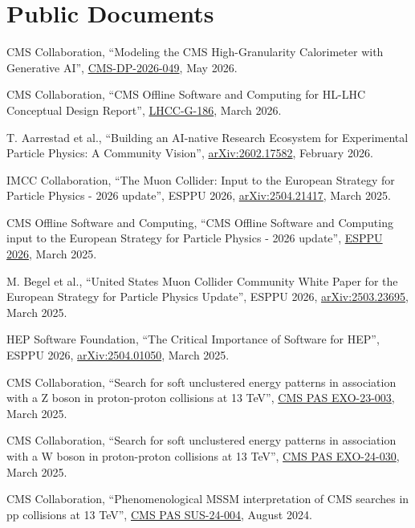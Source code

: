 \section{Public Documents}
\begin{nbdescription}[leftmargin=12pt,font=\normalfont,labelsep=0em]
\item CMS Collaboration, ``Modeling the CMS High-Granularity Calorimeter with Generative AI'', \href{https://cds.cern.ch/record/2962239}{CMS-DP-2026-049}, May 2026.
\item CMS Collaboration, ``CMS Offline Software and Computing for HL-LHC Conceptual Design Report'', \href{https://cds.cern.ch/record/2957472}{LHCC-G-186}, March 2026.
\item T. Aarrestad et al., ``Building an AI-native Research Ecosystem for Experimental Particle Physics: A Community Vision'', \href{https://arxiv.org/abs/2602.17582}{arXiv:2602.17582}, February 2026. %
\item IMCC Collaboration, ``The Muon Collider: Input to the European Strategy for Particle Physics - 2026 update'', ESPPU 2026, \href{https://arxiv.org/abs/2504.21417}{arXiv:2504.21417}, March 2025. %
\item CMS Offline Software and Computing, ``CMS Offline Software and Computing input to the European Strategy for Particle Physics - 2026 update'', \href{https://indico.cern.ch/event/1439855/contributions/6461523/}{ESPPU 2026}, March 2025.
\item M. Begel et al., ``United States Muon Collider Community White Paper for the European Strategy for Particle Physics Update'', ESPPU 2026, \href{https://arxiv.org/abs/2503.23695}{arXiv:2503.23695}, March 2025. %
\item HEP Software Foundation, ``The Critical Importance of Software for HEP'', ESPPU 2026, \href{https://arxiv.org/abs/2504.01050}{arXiv:2504.01050}, March 2025. %
\item CMS Collaboration, ``Search for soft unclustered energy patterns in association with a Z boson in proton-proton collisions at 13 TeV'', \href{https://cds.cern.ch/record/2928077}{CMS PAS EXO-23-003}, March 2025. %
\item CMS Collaboration, ``Search for soft unclustered energy patterns in association with a W boson in proton-proton collisions at 13 TeV'', \href{https://cds.cern.ch/record/2927983}{CMS PAS EXO-24-030}, March 2025. %
\item CMS Collaboration, ``Phenomenological MSSM interpretation of CMS searches in pp collisions at 13 TeV'', \href{http://cds.cern.ch/record/2906621}{CMS PAS SUS-24-004}, August 2024. %

\end{nbdescription}
